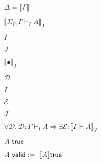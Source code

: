 \documentclass[10pt]{book}
\begin{document}
\begin{mdSnippets}
\begin{mdInlineSnippet}[b297937cbfcb107598632230d9bb4b03]%
$\Delta=\llbracket \Gamma \rrbracket $\end{mdInlineSnippet}%
\begin{mdInlineSnippet}%
$ \llbracket \Sigma_I;\Gamma\vdash_I A\rrbracket_J$\end{mdInlineSnippet}%
\begin{mdInlineSnippet}[dd7536794b63bf90eccfd37f9b147d7f]%
$I$\end{mdInlineSnippet}%
\begin{mdInlineSnippet}%
$J$\end{mdInlineSnippet}%
\begin{mdInlineSnippet}%
$\llbracket\bullet \rrbracket_J$\end{mdInlineSnippet}%
\begin{mdInlineSnippet}%
$\mathcal{D}$\end{mdInlineSnippet}%
\begin{mdInlineSnippet}[dd7536794b63bf90eccfd37f9b147d7f]%
$I$\end{mdInlineSnippet}%
\begin{mdInlineSnippet}%
$\mathcal{E}$\end{mdInlineSnippet}%
\begin{mdInlineSnippet}%
$J$\end{mdInlineSnippet}%
\begin{mdInlineSnippet}[8ee221b554f334322dd70423103cfd8b]%
$\forall \mathcal{D}. \ \mathcal{D}:\Gamma\vdash_I A \Longrightarrow \exists\mathcal{E}: \llbracket \Gamma\vdash A\rrbracket_J$\end{mdInlineSnippet}%
\begin{mdInlineSnippet}%
$A \ {\sf true}$\end{mdInlineSnippet}%
\begin{mdInlineSnippet}[9f791c2d98cbbb2d22338197dd5d3ca4]%
$A\  {\sf valid}:=\  \llbracket A \rrbracket {\sf true}$\end{mdInlineSnippet}%

\end{mdSnippets}
\end{document}
